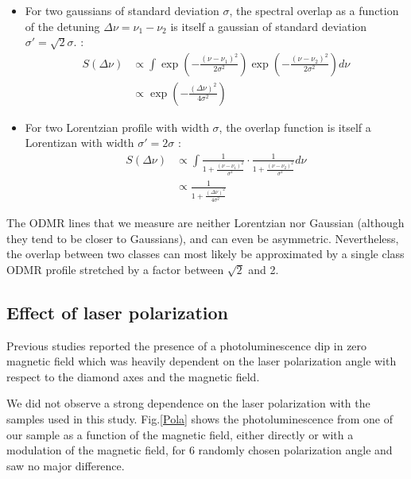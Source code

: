 \documentclass[preprintnumbers,amsmath,amssymb,onecolumn,12pt]{revtex4-2}
\begin{document}
\begin{itemize}
\item For two gaussians of standard deviation $\sigma$, the spectral overlap as a function of the detuning $\Delta \nu = \nu_1-\nu_2$ is itself a gaussian of standard deviation $\sigma'=\sqrt{2} \sigma$. :
\begin{align*}
S(\Delta \nu)&\propto \int \exp(-\frac{(\nu-\nu_1)^2}{2\sigma^2})\exp(-\frac{(\nu-\nu_2)^2}{2\sigma^2}) d\nu \\
&\propto\exp(-\frac{(\Delta \nu)^2}{4\sigma^2})
\end{align*}

\item For two Lorentzian profile with width $\sigma$, the overlap function is itself a Lorentizan with width $\sigma'=2\sigma$ :
\begin{align*}
S(\Delta \nu)&\propto \int \frac{1}{1+ \frac{(\nu-\nu_1)^2}{\sigma^2}}\cdot \frac{1}{1+ \frac{(\nu-\nu_2)^2}{\sigma^2}} d\nu \\
&\propto\frac{1}{1+ \frac{(\Delta \nu)^2}{4\sigma^2}}
\end{align*}
\end{itemize}

The ODMR lines that we measure are neither Lorentzian nor Gaussian (although they tend to be closer to Gaussians), and can even be asymmetric. Nevertheless, the overlap between two classes can most likely be approximated by a single class ODMR profile stretched by a factor between $\sqrt{2}$ and 2.


\subsection{Effect of laser polarization}
Previous studies \cite{anishchik2015low, filimonenko2020weak} reported the presence of a photoluminescence dip in zero magnetic field which was heavily dependent on the laser polarization angle with respect to the diamond axes and the magnetic field. 

We did not observe a strong dependence on the laser polarization with the samples used in this study. Fig.\ref{Pola} shows the photoluminescence from one of our sample as a function of the magnetic field, either directly or with a modulation of the magnetic field, for 6 randomly chosen polarization angle and saw no major difference. 
\end{document}
